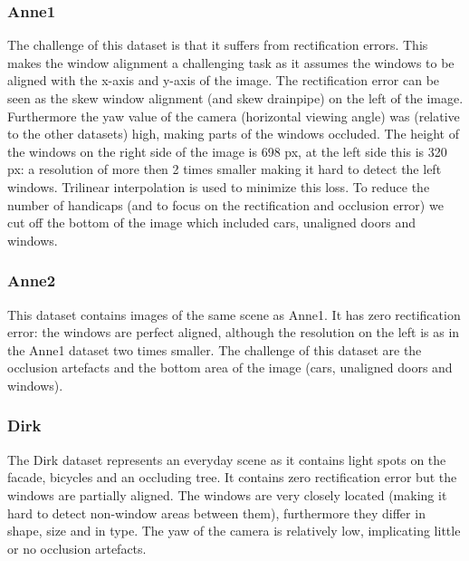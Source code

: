 \subsubsection{Anne1}
The challenge of this dataset is that it suffers from rectification errors.
This makes the window alignment a challenging task as it assumes the windows to
be aligned with the x-axis and y-axis of the image.
The rectification error can be seen as the skew window alignment (and skew
drainpipe) on the left of the image. 
Furthermore the yaw value of the camera (horizontal viewing angle) was (relative
to the other datasets) high, making parts of the windows occluded.  The height
of the windows on the right side of the image is 698 px, at the left side this
is 320 px: a resolution of more then 2 times smaller making it hard to detect
the left windows. Trilinear interpolation is used to minimize this loss.
To reduce the number of handicaps (and to focus on the rectification and
occlusion error) we cut off the bottom of the image which included cars, unaligned doors and windows.
\clearpage

\subsubsection{Anne2}
This dataset contains images of the same scene as Anne1.
It has zero rectification error: the windows are perfect aligned, although the
resolution on the left is as in the Anne1 dataset two times smaller.
The challenge of this dataset are the occlusion artefacts and the 
bottom area of the image (cars, unaligned doors and windows).
\clearpage

\subsubsection{Dirk}
The Dirk dataset represents an everyday scene as it contains light spots on the facade,
bicycles and an occluding tree.  It contains zero rectification error but the
windows are partially aligned.  The windows are very closely located (making it
hard to detect non-window areas between them), furthermore they differ in shape, size
and in type.  The yaw of the camera is relatively low, implicating little or no
occlusion artefacts.
\clearpage




